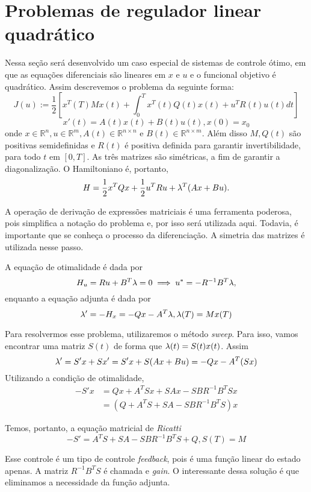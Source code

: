 \section{Problemas de regulador linear quadrático}

Nessa seção será desenvolvido um caso especial de sistemas de controle ótimo,
em que as equações diferenciais são lineares em $x$ e $u$ e o funcional
objetivo é quadrático. Assim descrevemos o problema da seguinte forma: 
$$
J(u) := \frac{1}{2}[x^T(T)Mx(t) + \int_0^T x^T(t)Q(t)x(t) + u^TR(t)u(t) dt]
$$
$$
x'(t) = A(t)x(t) + B(t)u(t), x(0) = x_0
$$
onde $x \in \mathbb{R}^n, u \in \mathbb{R}^m, A(t) \in \mathbb{R}^{n \times n}$
e $B(t) \in \mathbb{R}^{n\times m}$. Além disso $M, Q(t)$ são positivas
semidefinidas e $R(t)$ é positiva definida para garantir invertibilidade, para
todo $t$ em $[0,T]$. As três matrizes são simétricas, a fim de garantir a 
diagonalização. O Hamiltoniano é, portanto, 
$$H = \frac{1}{2}x^TQx + \frac{1}{2}u^TRu + \lambda^T(Ax + Bu).$$

A operação de derivação de expressões matriciais é uma ferramenta poderosa,
pois simplifica a notação do problema e, por isso será utilizada aqui.
Todavia, é importante que se conheça o processo da diferenciação. A simetria
das matrizes é utilizada nesse passo. 

A equação de otimalidade é dada por 
$$
H_u = Ru + B^T\lambda = 0 \implies u^* = - R^{-1}B^T\lambda,
$$
enquanto a equação adjunta é dada por 
$$
\lambda' = -H_x = -Qx - A^T\lambda, \lambda(T) = Mx(T)
$$

Para resolvermos esse problema, utilizaremos o método \textit{sweep}. Para
isso, vamos encontrar uma matriz $S(t)$ de forma que $\lambda(t) = S(t)x(t)$.
Assim 
$$
\lambda ' = S'x + Sx' = S'x + S(Ax + Bu) = -Qx -A^T(Sx)
$$
Utilizando a condição de otimalidade, 
\begin{equation*}
    \begin{split}
        -S'x &= Qx + A^TSx + SAx - SBR^{-1}B^TSx \\
        &= (Q + A^TS + SA - SBR^{-1}B^TS)x
    \end{split}
\end{equation*}

Temos, portanto, a equação matricial de \textit{Ricatti}
$$
-S' = A^TS + SA - SBR^{-1}B^TS + Q, S(T) = M
$$

Esse controle é um tipo de controle \textit{feedback}, pois é uma função
linear do estado apenas. A matriz $R^{-1}B^TS$ é chamada e \textit{gain}. O
interessante dessa solução é que eliminamos a necessidade da função adjunta. 

